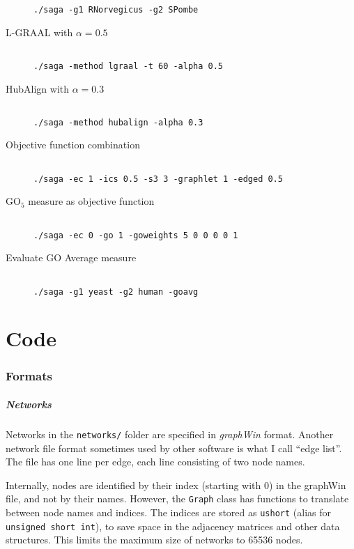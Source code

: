 \documentclass[]{article}
\begin{document}
\begin{description}
\begin{verbatim}
./saga -g1 RNorvegicus -g2 SPombe
\end{verbatim}
\item[L-GRAAL with $\alpha=0.5$]
\begin{verbatim}

./saga -method lgraal -t 60 -alpha 0.5
\end{verbatim}
\item[HubAlign with $\alpha=0.3$]
\begin{verbatim}

./saga -method hubalign -alpha 0.3
\end{verbatim}
\item[Objective function combination]
\begin{verbatim}

./saga -ec 1 -ics 0.5 -s3 3 -graphlet 1 -edged 0.5
\end{verbatim}
\item[$\mbox{GO}_5$ measure as objective function]
\begin{verbatim}

./saga -ec 0 -go 1 -goweights 5 0 0 0 0 1
\end{verbatim}
\item[Evaluate GO Average measure]
\begin{verbatim}

./saga -g1 yeast -g2 human -goavg
\end{verbatim}
\end{description}

\part{Code}

\section{Formats}\label{formats}
\subsubsection*{Networks}
Networks in the \texttt{networks/} folder are specified in \textit{graphWin} format. Another network file format sometimes used by other software is what I call ``edge list''. The file has one line per edge, each line consisting of two node names.

Internally, nodes are identified by their index (starting with 0) in the graphWin file, and not by their names. However, the \texttt{Graph} class has functions to translate between node names and indices. The indices are stored as \texttt{ushort} (alias for \texttt{unsigned short int}), to save space in the adjacency matrices and other data structures. This limits the maximum size of networks to 65536 nodes.
\end{document}
